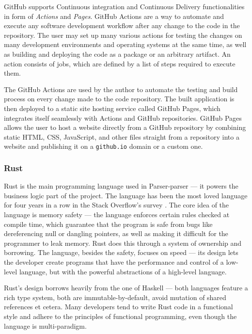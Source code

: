 \documentclass[english,engineering]{wizthesis}
\newcommand{\thisproject}{Parser-parser}
\begin{document}
GitHub supports Continuous integration and Continuous Delivery functionalities
in form of \emph{Actions} and \emph{Pages}. GitHub Actions are a way to automate
and execute any software development workflow after any change to the code in
the repository. The user may set up many various actions for testing the changes
on many development environments and operating systems at the same time, as well
as building and deploying the code as a package or an arbitrary artifact. An
action consists of jobs, which are defined by a list of steps required to
execute them.

The GitHub Actions are used by the author to automate the testing and build
process on every change made to the code repository. The built application is
then deployed to a static site hosting service called GitHub Pages, which
integrates itself seamlessly with Actions and GitHub repositories. GitHub Pages
allows the user to host a website directly from a GitHub repository by combining
static HTML, CSS, JavaScript, and other files straight from a repository into
a website and publishing it on a \texttt{github.io} domain or a custom one.

\subsubsection*{Rust}

Rust \cite{rust} is the main programming language used in \thisproject{} --- it
powers the business logic part of the project. The language has been the most
loved language for four years in a row in the Stack Overflow's survey
\cite{stack-overflow-insights-2019}. The core idea of the language is memory
safety --- the language enforces certain rules checked at compile time, which
guarantee that the program is safe from bugs like dereferencing null or dangling
pointers, as well as making it difficult for the programmer to leak memory. Rust
does this through a system of ownership and borrowing. The language, besides the
safety, focuses on speed --- its design lets the developer create programs that
have the performance and control of a low-level language, but with the powerful
abstractions of a high-level language.

Rust's design borrows heavily from the one of Haskell --- both languages feature
a rich type system, both are immutable-by-default, avoid mutation of shared
references et cetera. Many developers tend to write Rust code in a functional
style and adhere to the principles of functional programming, even though the
language is multi-paradigm.
\end{document}

